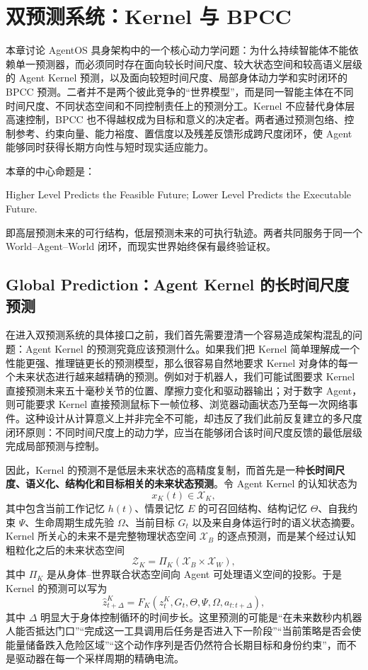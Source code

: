 \chapter{双预测系统：Kernel 与 BPCC}
\label{chap:dual_prediction_kernel_bpcc}

\begin{chapterlead}
本章讨论 AgentOS 具身架构中的一个核心动力学问题：为什么持续智能体不能依赖单一预测器，而必须同时存在面向较长时间尺度、较大状态空间和较高语义层级的 Agent Kernel 预测，以及面向较短时间尺度、局部身体动力学和实时闭环的 BPCC 预测。二者并不是两个彼此竞争的“世界模型”，而是同一智能主体在不同时间尺度、不同状态空间和不同控制责任上的预测分工。Kernel 不应替代身体层高速控制，BPCC 也不得越权成为目标和意义的决定者。两者通过预测包络、控制参考、约束向量、能力裕度、置信度以及残差反馈形成跨尺度闭环，使 Agent 能够同时获得长期方向性与短时现实适应能力。

本章的中心命题是：
\begin{statementbox}
Higher Level Predicts the Feasible Future;
Lower Level Predicts the Executable Future.
\end{statementbox}
即高层预测未来的可行结构，低层预测未来的可执行轨迹。两者共同服务于同一个 World--Agent--World 闭环，而现实世界始终保有最终验证权。
\end{chapterlead}

\section{Global Prediction：Agent Kernel 的长时间尺度预测}

在进入双预测系统的具体接口之前，我们首先需要澄清一个容易造成架构混乱的问题：Agent Kernel 的预测究竟应该预测什么。如果我们把 Kernel 简单理解成一个性能更强、推理链更长的预测模型，那么很容易自然地要求 Kernel 对身体的每一个未来状态进行越来越精确的预测。例如对于机器人，我们可能试图要求 Kernel 直接预测未来五十毫秒关节的位置、摩擦力变化和驱动器输出；对于数字 Agent，则可能要求 Kernel 直接预测鼠标下一帧位移、浏览器动画状态乃至每一次网络事件。这种设计从计算意义上并非完全不可能，却违反了我们此前反复建立的多尺度闭环原则：不同时间尺度上的动力学，应当在能够闭合该时间尺度反馈的最低层级完成局部预测与控制。

因此，Kernel 的预测不是低层未来状态的高精度复制，而首先是一种\textbf{长时间尺度、语义化、结构化和目标相关的未来状态预测}。令 Agent Kernel 的认知状态为
\[
x_K(t)\in\mathcal X_K,
\]
其中包含当前工作记忆 $h(t)$、情景记忆 $E$ 的可召回结构、结构记忆 $\Theta$、自我约束 $\Psi$、生命周期生成先验 $\Omega$、当前目标 $G_t$ 以及来自身体运行时的语义状态摘要。Kernel 所关心的未来不是完整物理状态空间 $\mathcal X_B$ 的逐点预测，而是某个经过认知粗粒化之后的未来状态空间
\[
\mathcal Z_K=\Pi_K(\mathcal X_B\times\mathcal X_W),
\]
其中 $\Pi_K$ 是从身体--世界联合状态空间向 Agent 可处理语义空间的投影。于是 Kernel 的预测可以写为
\[
\hat z_{t+\Delta}^{K}
=
F_K
\left(
z_t^K,
G_t,
\Theta,
\Psi,
\Omega,
a_{t:t+\Delta}
\right),
\]
其中 $\Delta$ 明显大于身体控制循环的时间步长。这里预测的可能是“在未来数秒内机器人能否抵达门口”“完成这一工具调用后任务是否进入下一阶段”“当前策略是否会使能量储备跌入危险区域”“这个动作序列是否仍然符合长期目标和身份约束”，而不是驱动器在每一个采样周期的精确电流。

